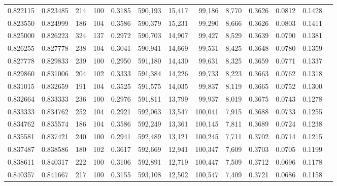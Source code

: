 \begin{tabular}{rrrrrrrrrrrrr}
0.822115 & 0.823485 &    214 &   100 &                                     0.3185 & 590,193 &  15,417 &  99,186 &   8,770 & 0.3626 & 0.0812 & 0.1428 \\
0.823550 & 0.824999 &    186 &   104 &                                     0.3586 & 590,379 &  15,231 &  99,290 &   8,666 & 0.3626 & 0.0803 & 0.1411 \\
0.825000 & 0.826223 &    324 &   137 &                                     0.2972 & 590,703 &  14,907 &  99,427 &   8,529 & 0.3639 & 0.0790 & 0.1381 \\
0.826255 & 0.827778 &    238 &   104 &                                     0.3041 & 590,941 &  14,669 &  99,531 &   8,425 & 0.3648 & 0.0780 & 0.1359 \\
0.827778 & 0.829833 &    239 &   100 &                                     0.2950 & 591,180 &  14,430 &  99,631 &   8,325 & 0.3659 & 0.0771 & 0.1337 \\
0.829860 & 0.831006 &    204 &   102 &                                     0.3333 & 591,384 &  14,226 &  99,733 &   8,223 & 0.3663 & 0.0762 & 0.1318 \\
0.831015 & 0.832659 &    191 &   104 &                                     0.3525 & 591,575 &  14,035 &  99,837 &   8,119 & 0.3665 & 0.0752 & 0.1300 \\
0.832664 & 0.833333 &    236 &   100 &                                     0.2976 & 591,811 &  13,799 &  99,937 &   8,019 & 0.3675 & 0.0743 & 0.1278 \\
0.833333 & 0.834762 &    252 &   104 &                                     0.2921 & 592,063 &  13,547 & 100,041 &   7,915 & 0.3688 & 0.0733 & 0.1255 \\
0.834762 & 0.835574 &    186 &   104 &                                     0.3586 & 592,249 &  13,361 & 100,145 &   7,811 & 0.3689 & 0.0724 & 0.1238 \\
0.835581 & 0.837421 &    240 &   100 &                                     0.2941 & 592,489 &  13,121 & 100,245 &   7,711 & 0.3702 & 0.0714 & 0.1215 \\
0.837487 & 0.838586 &    180 &   102 &                                     0.3617 & 592,669 &  12,941 & 100,347 &   7,609 & 0.3703 & 0.0705 & 0.1199 \\
0.838611 & 0.840317 &    222 &   100 &                                     0.3106 & 592,891 &  12,719 & 100,447 &   7,509 & 0.3712 & 0.0696 & 0.1178 \\
0.840357 & 0.841667 &    217 &   100 &                                     0.3155 & 593,108 &  12,502 & 100,547 &   7,409 & 0.3721 & 0.0686 & 0.1158 \\

\end{tabular}
